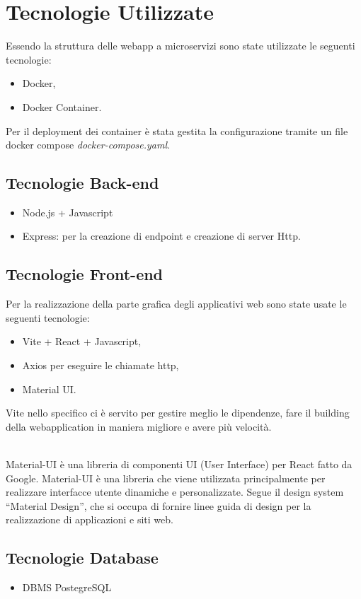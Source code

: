 \section{Tecnologie Utilizzate}
Essendo la struttura delle webapp a microservizi  sono state utilizzate le seguenti tecnologie:
\begin{itemize}
    \item Docker,
    \item Docker Container.
\end{itemize}

Per il deployment dei container è stata gestita la configurazione tramite un file docker compose \textit{docker-compose.yaml}.
\subsection{Tecnologie Back-end}
\begin{itemize}
    \item Node.js + Javascript
    \item Express: per la creazione di endpoint e creazione di server Http. 
\end{itemize}

\subsection{Tecnologie Front-end}
Per la realizzazione della parte grafica degli applicativi web sono state usate le seguenti tecnologie:
\begin{itemize}
    \item Vite + React + Javascript,
    \item Axios per eseguire le chiamate http,
    \item Material UI.
\end{itemize}

Vite nello specifico ci è servito per gestire meglio le dipendenze, fare il building della webapplication in maniera migliore e avere più velocità. \\\

Material-UI è una libreria di componenti UI (User Interface) per React fatto da Google. Material-UI è una libreria che viene utilizzata principalmente per realizzare interfacce utente dinamiche e personalizzate.
Segue il design system “Material Design”, che si occupa di fornire linee guida di design per la realizzazione di applicazioni e siti web.\\

\subsection{Tecnologie Database}
\begin{itemize}
    \item DBMS PostegreSQL
\end{itemize}


